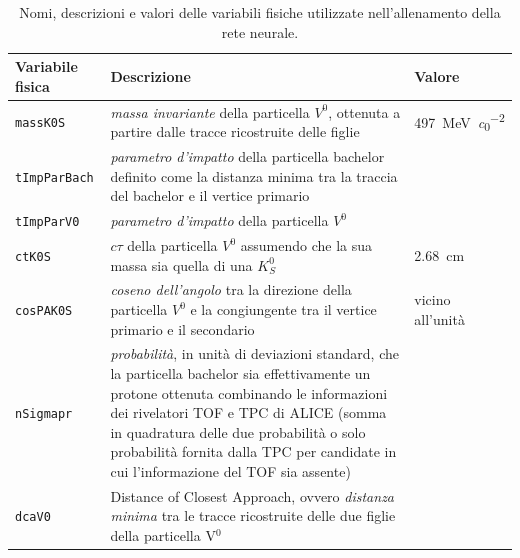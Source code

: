     \begin{table}[p]
        \centering
        \begin{tabular}{|>{\centering\arraybackslash}m{3cm}|>{\centering\arraybackslash}m{8.2cm}|>{\centering\arraybackslash}m{3cm}|}
            \hline
            \textbf{Variabile fisica} & \textbf{Descrizione} & \textbf{Valore} \\ 
            \hline
            \texttt{massK0S} & \textit{massa invariante} della particella $V^{0}$, ottenuta a partire dalle tracce ricostruite delle figlie & \qty{497}{\mega \eV \per \clight^2} \\ 
            \hline
            \texttt{tImpParBach} & \textit{parametro d'impatto} della particella bachelor definito come la distanza minima tra la traccia del bachelor e il vertice primario & \\ 
            \hline
            \texttt{tImpParV0} & \textit{parametro d'impatto} della particella $V^{0}$ & \\ 
            \hline
            \texttt{ctK0S} & $c \tau$ della particella $V^{0}$ assumendo che la sua massa sia quella di una $K^{0}_{S}$ & \qty{2.68}{\centi \meter} \\ 
            \hline
            \texttt{cosPAK0S} & \textit{coseno dell'angolo} tra la direzione della particella $V^{0}$ e la congiungente tra il vertice primario e il secondario & vicino all'unità \\ 
            \hline
            \texttt{nSigmapr} & \textit{probabilità}, in unità di deviazioni standard, che la particella bachelor sia effettivamente un protone ottenuta combinando le informazioni dei rivelatori TOF e TPC di ALICE (somma in quadratura delle due probabilità o solo probabilità fornita dalla TPC per candidate in cui l'informazione del TOF sia assente) & \\ 
            \hline
            \texttt{dcaV0} & Distance of Closest Approach, ovvero \textit{distanza minima} tra le tracce ricostruite delle due figlie della particella V$^{0}$ & \\ 
            \hline
        \end{tabular}
        \caption{Nomi, descrizioni e valori delle variabili fisiche utilizzate nell’allenamento della rete neurale.}
        \label{tab:3-1-vars}
    \end{table}
    
